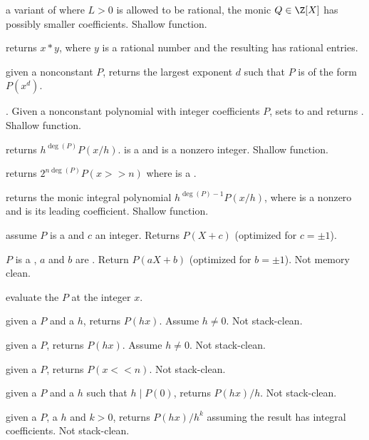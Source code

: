  a variant of 
where $L > 0$ is allowed to be rational, the monic $Q\in \Z[X]$ has possibly
smaller coefficients. Shallow function.

 returns $x*y$, where $y$ is a rational number
and the resulting  has rational entries.

 given a nonconstant 
$P$, returns the largest exponent $d$ such that $P$ is of the form $P(x^d)$.

. Given a nonconstant
polynomial with integer coefficients $P$, sets  to
 and returns . Shallow
function.

 returns $h^{\deg(P)} P(x/h)$.
 is a  and  is a nonzero integer. Shallow function.

 returns $2^{n\deg(P)} P(x>>n)$ where
 is a .

 returns the monic integral polynomial
$h^{\deg(P)-1} P(x/h)$, where  is a nonzero  and  is
its leading coefficient. Shallow function.

 assume $P$ is a  and $c$ an
integer. Returns $P(X + c)$ (optimized for $c = \pm 1$).

 $P$ is a , $a$ and $b$
are . Return $P(aX + b)$ (optimized for $b = \pm 1$). Not memory
clean.

 evaluate the  $P$ at the integer $x$.

 given a  $P$ and a  $h$,
returns $P(hx)$. Assume $h \neq 0$. Not stack-clean.

 given a  $P$,
returns $P(hx)$. Assume $h \neq 0$. Not stack-clean.

 given a  $P$, returns
$P(x<<n)$. Not stack-clean.

 given a  $P$ and a  $h$
such that $h \mid P(0)$, returns $P(hx)/h$. Not stack-clean.

 given a  $P$,
a  $h$ and $k > 0$, returns $P(hx)/h^k$ assuming the result has
integral coefficients. Not stack-clean.

